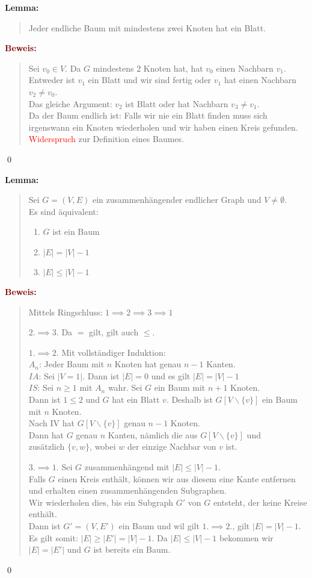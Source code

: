 \documentclass{article}
\newcommand{\red}[1]{\textcolor{red}{#1}}
\newcommand{\dgr}[1]{\textcolor{dgr}{#1}}
\newcommand{\maroon}[1]{\textcolor{maroon}{#1}}
\newcommand{\lem}[1]{\dgr{\textbf{Lemma: }}\begin{quote}#1\end{quote}}
\newcommand{\pr}[1]{\maroon{\textbf{Beweis: }}\begin{quote}#1\end{quote}\qed}
\begin{document}
\newpage
\lem{
    Jeder endliche Baum mit mindestens zwei Knoten hat ein Blatt.
}
\pr{
    Sei $v_0 \in V$. Da $G$ mindestens $2$ Knoten hat, hat $v_0$ einen Nachbarn $v_1$. Entweder ist $v_1$ ein Blatt und wir sind fertig oder $v_1$ hat einen Nachbarn $v_2 \ne v_0$.\\
    Das gleiche Argument: $v_2$ ist Blatt oder hat Nachbarn $v_3 \ne v_1$.\\
    Da der Baum endlich ist: Falls wir nie ein Blatt finden muss sich irgenswann ein Knoten wiederholen und wir haben einen Kreis gefunden. \red{Widerspruch} zur Definition eines Baumes.
}

\lem{
    Sei $G=(V,E)$ ein zusammenhängender endlicher Graph und $V \ne \emptyset$.\\
    Es sind äquivalent:
    \begin{enumerate}
        \item $G$ ist ein Baum
        \item $|E| = |V| - 1$
        \item $|E| \le |V| - 1$
    \end{enumerate}
}

\pr{
    Mittels Ringschluss: $1 \implies 2 \implies 3 \implies 1$

    \underline{$2. \implies 3.$} Da $=$ gilt, gilt auch $\le$.

    \underline{$1. \implies 2.$} Mit vollständiger Induktion:\\
    $A_n$: Jeder Baum mit $n$ Knoten hat genau $n-1$ Kanten.\\
    $IA$: Sei $|V=1|$. Dann ist $|E| = 0$ und es gilt $|E| = |V|-1$\\
    $IS$: Sei $n \ge 1$ mit $A_n$ wahr. Sei $G$ ein Baum mit $n+1$ Knoten.\\
    Dann ist $1 \le 2$ und $G$ hat ein Blatt $v$. Deshalb ist $G[V \backslash \{v\}]$ ein Baum mit $n$ Knoten.\\
    Nach IV hat $G[V \backslash \{v\}]$ genau $n-1$ Knoten.\\
    Dann hat $G$ genau $n$ Kanten, nämlich die aus $G[V \backslash \{v\}]$ und\\
    zusätzlich $\{v,w\}$, wobei $w$ der einzige Nachbar von $v$ ist.

    \underline{$3. \implies 1.$} Sei $G$ zusammenhängend mit $|E| \le |V| - 1$.\\
    Falls $G$ einen Kreis enthält, können wir aus diesem eine Kante entfernen und erhalten einen zusammenhängenden Subgraphen.\\
    Wir wiederholen dies, bis ein Subgraph $G'$ von $G$ entsteht, der keine Kreise enthält.\\
    Dann ist $G' = (V,E')$ ein Baum und wil gilt $1. \implies 2.$, gilt $|E| = |V|-1$.\\
    Es gilt somit: $|E| \ge |E'| = |V| - 1$. Da $|E| \le |V|-1$ bekommen wir $|E|=|E'|$ und $G$ ist bereits ein Baum.
}
\end{document}
